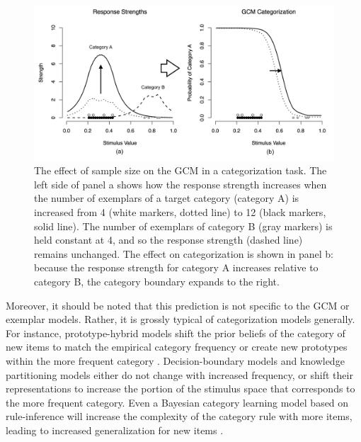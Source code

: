 \documentclass[doc,apacite]{apa6}
\begin{document}
\begin{figure}[t]
\begin{center}
\includegraphics[scale=.35]{figures/GCM-cat.png}
\caption{The effect of sample size on the GCM in a categorization task. The left side of panel a shows how the response strength increases when the number of exemplars of a target category (category A) is increased from 4 (white markers, dotted line) to 12 (black markers, solid line). The number of exemplars of category B (gray markers) is held constant at 4, and so the response strength (dashed line) remains unchanged. The effect on categorization is shown in panel b: because the response strength for category A increases relative to category B, the category boundary expands to the right.}
\label{fig:gcmExample}
\end{center}
\end{figure}


Moreover, it should be noted that this prediction is not specific to the GCM or exemplar models. Rather, it is grossly typical of categorization models generally. For instance, prototype-hybrid models shift the prior beliefs of the category of new items to match the empirical category frequency or create new prototypes within the more frequent category \cite{anderson1990adaptive, anderson1991adaptive, sanborn2010rational, sanborn2006more, love2004sustain}. Decision-boundary models \cite{ashby1988decision, ashby1988toward, ashby1986varieties, ashby1993relations} and knowledge partitioning models \cite{lewandowsky2000knowledge, lewandowsky2000competing, yang2004knowledge} either do not change with increased frequency, or shift their representations to increase the portion of the stimulus space that corresponds to the more frequent category.
Even a Bayesian category learning model based on rule-inference will increase the complexity of the category rule with more items, leading to increased generalization for new items \cite{Goodman2008rational}.
\end{document}
